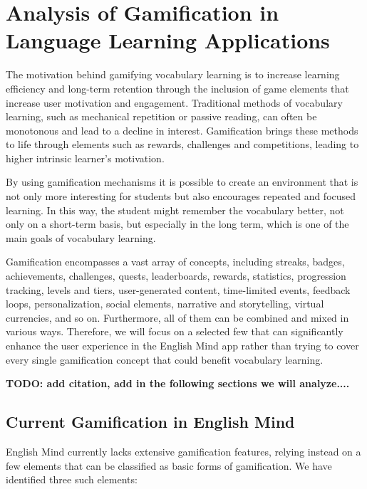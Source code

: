 \chapter{Analysis of Gamification in Language Learning Applications}

The motivation behind gamifying vocabulary learning is to increase learning efficiency and long-term retention through the inclusion of game elements that increase user motivation and engagement. Traditional methods of vocabulary learning, such as mechanical repetition or passive reading, can often be monotonous and lead to a decline in interest. Gamification brings these methods to life through elements such as rewards, challenges and competitions, leading to higher intrinsic learner's motivation.

By using gamification mechanisms it is possible to create an environment that is not only more interesting for students but also encourages repeated and focused learning. In this way, the student might remember the vocabulary better, not only on a short-term basis, but especially in the long term, which is one of the main goals of vocabulary learning.

Gamification encompasses a vast array of concepts, including streaks, badges, achievements, challenges, quests, leaderboards, rewards, statistics, progression tracking, levels and tiers, user-generated content, time-limited events, feedback loops, personalization, social elements, narrative and storytelling, virtual currencies, and so on. Furthermore, all of them can be combined and mixed in various ways. Therefore, we will focus on a selected few that can significantly enhance the user experience in the English Mind app rather than trying to cover every single gamification concept that could benefit vocabulary learning.

\textbf{TODO: add citation, add in the following sections we will analyze....}

\section{Current Gamification in English Mind}

English Mind currently lacks extensive gamification features, relying instead on a few elements that can be classified as basic forms of gamification. We have identified three such elements:

